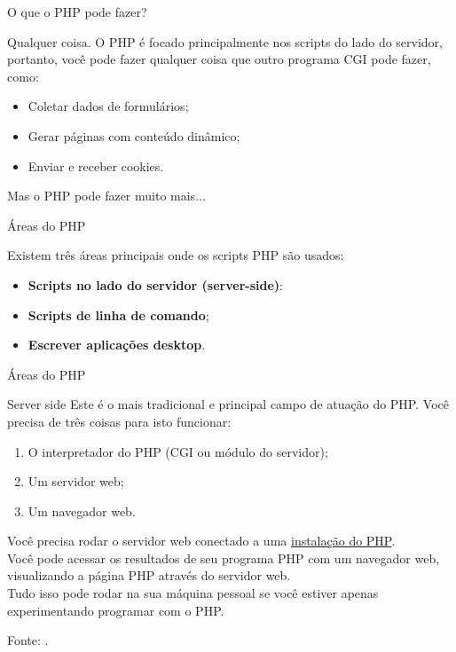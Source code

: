 \documentclass{beamer}
\begin{document}
\begin{frame}{O que o PHP pode fazer?}

Qualquer coisa. O PHP é focado principalmente nos scripts do lado do servidor, portanto, você pode fazer qualquer coisa que outro programa CGI pode fazer, como:
\begin{itemize}
    \item Coletar dados de formulários;
    \item Gerar páginas com conteúdo dinâmico;
    \item Enviar e receber cookies.
\end{itemize}
 Mas o PHP pode fazer muito mais...
\end{frame}
\begin{frame}{Áreas do PHP}

Existem três áreas principais onde os scripts PHP são usados:
\begin{itemize}
    \item \textbf{Scripts no lado do servidor (server-side)}: 
    \item \textbf{Scripts de linha de comando};
    \item \textbf{Escrever aplicações desktop}.
\end{itemize}
\end{frame}
\begin{frame}{Áreas do PHP}
\begin{block}{Server side}
Este é o mais tradicional e principal campo de atuação do PHP. Você precisa de três coisas para isto funcionar: 
\begin{enumerate}
    \item O interpretador do PHP (CGI ou módulo do servidor);
    \item Um servidor web;
    \item Um navegador web.
\end{enumerate} 
Você precisa rodar o servidor web conectado a uma \underline{instalação do PHP}.\\ 
Você pode acessar os resultados de seu programa PHP com um navegador web, visualizando a página PHP através do servidor web. \\
Tudo isso pode rodar na sua máquina pessoal se você estiver apenas experimentando programar com o PHP. 

\end{block}
    \tiny Fonte: \cite{achout2022php}.
\end{frame}
\end{document}
